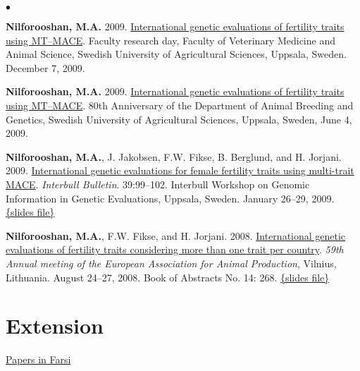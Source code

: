 \documentclass[margin,line]{res}
\newenvironment{list2}{
  \begin{list}{$\bullet$}{%
      \setlength{\itemsep}{0in}
      \setlength{\parsep}{0in} \setlength{\parskip}{0in}
      \setlength{\topsep}{0in} \setlength{\partopsep}{0in}
      \setlength{\leftmargin}{0.2in}}}{\end{list}}
\begin{document}
\begin{resume}
\begin{list2}
    \item {\bf Nilforooshan, M.A.} 2009. \href{https://drive.google.com/file/d/0B2l_izQwJmVpUC1TVkx2MVc1ZUE/view?usp=sharing&resourcekey=0-l8dXNYtXDSBuYJHiZwAxZQ}{International genetic evaluations of fertility traits using MT–MACE}. Faculty research day, Faculty of Veterinary Medicine and Animal Science, Swedish University of Agricultural Sciences, Uppsala, Sweden. December 7, 2009.
    \item {\bf Nilforooshan, M.A.} 2009. \href{https://drive.google.com/file/d/0B2l_izQwJmVpUC1TVkx2MVc1ZUE/view?usp=sharing&resourcekey=0-l8dXNYtXDSBuYJHiZwAxZQ}{International genetic evaluations of fertility traits using MT–MACE}. 80th Anniversary of the Department of Animal Breeding and Genetics, Swedish University of Agricultural Sciences, Uppsala, Sweden, June 4, 2009.
    \item {\bf Nilforooshan, M.A.}, J. Jakobsen, F.W. Fikse, B. Berglund, and H. Jorjani. 2009. \href{https://www.researchgate.net/publication/237781427_International_Genetic_Evaluations_for_Female_Fertility_Traits_Using_Multi-trait_MACE}{International genetic evaluations for female fertility traits using multi-trait MACE}. {\em Interbull Bulletin}. 39:99--102. Interbull Workshop on Genomic Information in Genetic Evaluations, Uppsala, Sweden. January 26--29, 2009. \href{https://drive.google.com/file/d/0B2l_izQwJmVpZG1sZlg2cF9zRWc/view?usp=sharing&resourcekey=0-JmFa0ZnWzZzcCnjVFH3VoA}{\{slides file\}}
    \item {\bf Nilforooshan, M.A.}, F.W. Fikse, and H. Jorjani. 2008. \href{https://www.researchgate.net/publication/358219159_International_genetic_evaluations_of_fertility_traits_considering_more_than_one_trait_per_country}{International genetic evaluations of fertility traits considering more than one trait per country}. {\em 59th Annual meeting of the European Association for Animal Production}, Vilnius, Lithuania. August 24--27, 2008. Book of Abstracts No. 14: 268. \href{https://drive.google.com/file/d/0B2l_izQwJmVpd2pieXNtWTQxMkE/view?usp=sharing&resourcekey=0-Q2h6mMWM8Aw-Tsi787os4g}{\{slides file\}}
  \end{list2}
  \section{\sc Extension}

  \href{https://nilforooshan.github.io/resume/extension}{Papers in Farsi}

\end{resume}
\end{document}

